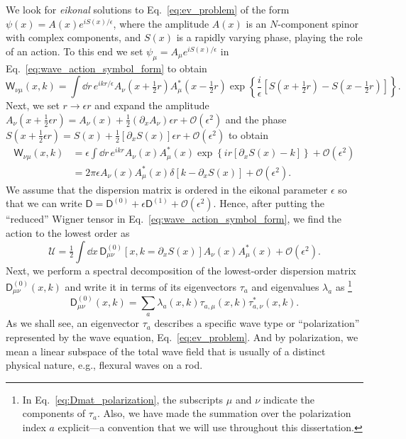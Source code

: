 We look for \emph{eikonal} solutions to Eq.~\eqref{eq:ev_problem} of the form $\psi(x) = A(x)e^{iS(x)/\epsilon}$, where the amplitude $A(x)$ is an $N$-component spinor with complex components, and $S(x)$ is a rapidly varying phase, playing the role of an action.
To this end we set $\psi_{\mu} = A_{\mu}e^{iS(x)/\epsilon}$ in Eq.~\eqref{eq:wave_action_symbol_form} to obtain%
%
\begin{equation}
    \mathsf{W}_{\nu\mu}(x, k) = \int \dd{r}\,e^{ikr/\epsilon} A_{\nu}\left(x + \tfrac{1}{2} r\right)A_{\mu}^{*}\left(x - \tfrac{1}{2} r\right)\exp\left\{\frac{i}{\epsilon}\left[S\left(x + \tfrac{1}{2} r\right) - S\left(x - \tfrac{1}{2} r\right)\right]\right\}.
\end{equation}
%
Next, we set $r \to \epsilon r$ and expand the amplitude $A_{\nu}(x + \frac{1}{2}\epsilon r) = A_{\nu}(x) + \frac{1}{2}(\partial_{x}A_{\nu})\epsilon r + \mathcal{O}(\epsilon^{2})$ and the phase $S(x + \frac{1}{2}\epsilon r) = S(x) + \frac{1}{2}[\partial_{x}S(x)]\epsilon r + \mathcal{O}(\epsilon^{2})$ to obtain
%
\begin{equation}
  \begin{aligned}
    \mathsf{W}_{\nu\mu}(x, k) &= \epsilon\int \dd{r}\,e^{ikr} A_{\nu}(x)A_{\mu}^{*}(x)\exp\left\{ir\left[\partial_{x}S(x) - k\right]\right\} + \mathcal{O}(\epsilon^{2}) \\
                        &= 2\pi\epsilon A_{\nu}(x)A^{*}_{\mu}(x)\delta\left[k - \partial_{x}S(x)\right] + \mathcal{O}(\epsilon^{2}).
  \end{aligned}
\end{equation}
%
We assume that the dispersion matrix is ordered in the eikonal parameter $\epsilon$ so that we can write
$\mathsf{D} = \mathsf{D}^{(0)} + \epsilon \mathsf{D}^{(1)} + \mathcal{O}(\epsilon^{2})$.
Hence, after putting the ``reduced'' Wigner tensor in Eq.~\eqref{eq:wave_action_symbol_form}, we find the action to the lowest order as
%
\begin{equation}
  \mathscr{U} = \tfrac{1}{2}\int \dd{x}\, \mathsf{D}^{(0)}_{\mu\nu}\left[x, k=\partial_{x}S(x)\right]A_{\nu}(x)A^{*}_{\mu}(x) + \mathcal{O}(\epsilon^{2}).
  \label{eq:wave_action_reduced_1}
\end{equation}
%
Next, we perform a spectral decomposition of the lowest-order dispersion matrix $\mathsf{D}^{(0)}_{\mu\nu}(x, k)$ and write it in terms of its eigenvectors $\tau_{a}$ and eigenvalues $\lambda_{a}$ as%
\footnote{In Eq.~\eqref{eq:Dmat_polarization}, the subscripts $\mu$ and $\nu$ indicate the components of $\tau_{a}$.
Also, we have made the summation over the polarization index $a$ explicit---a convention that we will use throughout this dissertation.}
%
\begin{equation}
  \mathsf{D}^{(0)}_{\mu\nu}(x, k) = \sum_{a} \lambda_{a}(x, k) \tau_{a, \mu}(x, k) \tau_{a, \nu}^{*}(x, k).
  \label{eq:Dmat_polarization}
\end{equation}
%
As we shall see, an eigenvector $\tau_{a}$ describes a specific wave type or ``polarization'' represented by the wave equation, Eq.~\eqref{eq:ev_problem}.
And by polarization, we mean a linear subspace of the total wave field that is usually of a distinct physical nature, e.g., flexural waves on a rod.

